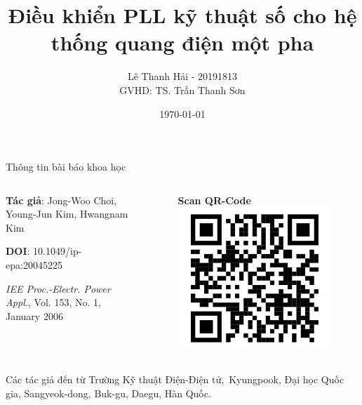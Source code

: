 \documentclass[11pt]{beamer}
\title{Điều khiển PLL kỹ thuật số cho hệ thống quang điện một pha}
\author{Lê Thanh Hải - 20191813\\GVHD: TS. Trần Thanh Sơn\\[20pt]}
\date{\today}
\renewcommand{\label}[1]{%
			\gdef\sfname{sf:##1}}%
\begin{document}

	\begin{frame}
		\titlepage
	\end{frame}



	\begin{frame}[t]{Thông tin bài báo khoa học} \vspace{4pt}
		\begin{columns}
			
			\begin{column}{0.5\textwidth}
				\textbf{Tác giả}: Jong-Woo Choi, Young-Jun Kim, Hwangnam Kim
				
				\vspace{4pt}
				\textbf{DOI}: 10.1049/ip-epa:20045225
				
				\vspace{7pt}
				\emph{IEE Proc.-Electr. Power Appl.}, Vol. 153, No. 1, January 2006
				
			\end{column}
		
			\begin{column}{0.5\textwidth}  %
				\begin{center}
					\begin{figure}[h]
						\textbf{Scan QR-Code}
						\includegraphics[width=1\textwidth]{QRCode.jpg}
					\end{figure}
				\end{center}
			\end{column}
		\end{columns}
		Các tác giả đến từ Trường Kỹ thuật Điện-Điện tử,~Kyungpook, Đại học Quốc gia, Sangyeok-dong, Buk-gu, Daegu, Hàn Quốc.
	\end{frame}
\end{document}
